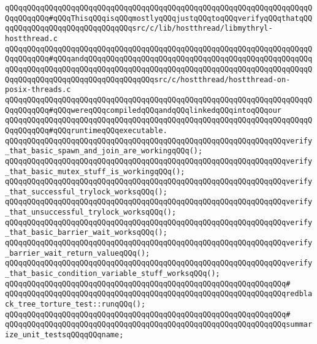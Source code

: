 \verb|qQQqqQQqqQQqqQQqqQQqqQQqqQQqqQQqqQQqqQQqqQQqqQQqqQQqqQQqqQQqqQQqqQQqqQQqqQQqqQQq#qQQqThisqQQqisqQQqmostlyqQQqjustqQQqtoqQQqverifyqQQqthatqQQqqQQqqQQqqQQqqQQqqQQqqQQqqQQqsrc/c/lib/hostthread/libmythryl-hostthread.c|\newline
\verb|qQQqqQQqqQQqqQQqqQQqqQQqqQQqqQQqqQQqqQQqqQQqqQQqqQQqqQQqqQQqqQQqqQQqqQQqqQQqqQQq#qQQqandqQQqqQQqqQQqqQQqqQQqqQQqqQQqqQQqqQQqqQQqqQQqqQQqqQQqqQQqqQQqqQQqqQQqqQQqqQQqqQQqqQQqqQQqqQQqqQQqqQQqqQQqqQQqqQQqqQQqqQQqqQQqqQQqqQQqqQQqqQQqqQQqqQQqqQQqqQQqsrc/c/hostthread/hostthread-on-posix-threads.c|\newline
\verb|qQQqqQQqqQQqqQQqqQQqqQQqqQQqqQQqqQQqqQQqqQQqqQQqqQQqqQQqqQQqqQQqqQQqqQQqqQQqqQQq#qQQqwereqQQqcompiledqQQqandqQQqlinkedqQQqintoqQQqour|\newline
\verb|qQQqqQQqqQQqqQQqqQQqqQQqqQQqqQQqqQQqqQQqqQQqqQQqqQQqqQQqqQQqqQQqqQQqqQQqqQQqqQQq#qQQqruntimeqQQqexecutable.|\newline
\newline
\verb|qQQqqQQqqQQqqQQqqQQqqQQqqQQqqQQqqQQqqQQqqQQqqQQqqQQqqQQqqQQqqQQqverify_that_basic_spawn_and_join_are_workingqQQq();|\newline
\verb|qQQqqQQqqQQqqQQqqQQqqQQqqQQqqQQqqQQqqQQqqQQqqQQqqQQqqQQqqQQqqQQqverify_that_basic_mutex_stuff_is_workingqQQq();|\newline
\verb|qQQqqQQqqQQqqQQqqQQqqQQqqQQqqQQqqQQqqQQqqQQqqQQqqQQqqQQqqQQqqQQqverify_that_successful_trylock_worksqQQq();|\newline
\verb|qQQqqQQqqQQqqQQqqQQqqQQqqQQqqQQqqQQqqQQqqQQqqQQqqQQqqQQqqQQqqQQqverify_that_unsuccessful_trylock_worksqQQq();|\newline
\verb|qQQqqQQqqQQqqQQqqQQqqQQqqQQqqQQqqQQqqQQqqQQqqQQqqQQqqQQqqQQqqQQqverify_that_basic_barrier_wait_worksqQQq();|\newline
\verb|qQQqqQQqqQQqqQQqqQQqqQQqqQQqqQQqqQQqqQQqqQQqqQQqqQQqqQQqqQQqqQQqverify_barrier_wait_return_valueqQQq();|\newline
\verb|qQQqqQQqqQQqqQQqqQQqqQQqqQQqqQQqqQQqqQQqqQQqqQQqqQQqqQQqqQQqqQQqverify_that_basic_condition_variable_stuff_worksqQQq();|\newline
\verb|qQQqqQQqqQQqqQQqqQQqqQQqqQQqqQQqqQQqqQQqqQQqqQQqqQQqqQQqqQQqqQQq#|\newline
\verb|qQQqqQQqqQQqqQQqqQQqqQQqqQQqqQQqqQQqqQQqqQQqqQQqqQQqqQQqqQQqqQQqredblack_tree_torture_test::runqQQq();|\newline
\verb|qQQqqQQqqQQqqQQqqQQqqQQqqQQqqQQqqQQqqQQqqQQqqQQqqQQqqQQqqQQqqQQq#|\newline
\verb|qQQqqQQqqQQqqQQqqQQqqQQqqQQqqQQqqQQqqQQqqQQqqQQqqQQqqQQqqQQqqQQqsummarize_unit_testsqQQqqQQqname;|\newline
